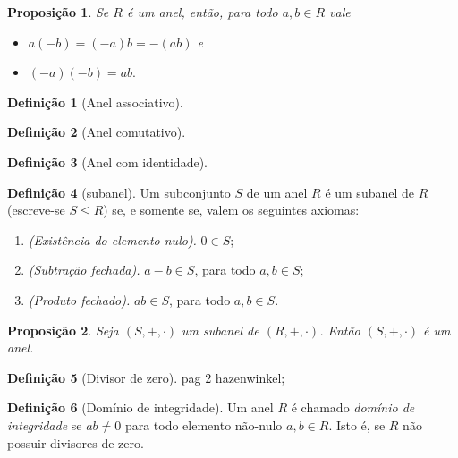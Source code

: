 \documentclass[a4paper,12pt]{report}
\theoremstyle{plain}
\newtheorem{proposicao}{Proposição}[section]
\theoremstyle{definition}
\newtheorem{definicao}{Definição}[section]
\begin{document}
	\begin{proposicao}
		Se $R$ é um anel, então, para todo $a,b\in R$ vale
		\begin{itemize}
			\item $a(-b) = (-a)b = -(ab)$ e
			\item $(-a)(-b) = ab.$
		\end{itemize}
	\end{proposicao}
	
	\begin{definicao}[Anel associativo]
		
	\end{definicao}
	
	\begin{definicao}[Anel comutativo]
		
	\end{definicao}
	
	\begin{definicao}[Anel com identidade]
		
	\end{definicao}
	
	\begin{definicao}[subanel]
		Um subconjunto $S$ de um anel $R$ é um subanel de $R$ (escreve-se $S\leq R$) se, e somente se, valem os seguintes axiomas:
		\begin{enumerate}
			\item \emph{(Existência do elemento nulo).} $0 \in S$;
			\item \emph{(Subtração fechada).} $a-b \in S$, para todo $a,b\in S$;
			\item \emph{(Produto fechado).} $ab\in S$, para todo $a,b\in S$.
		\end{enumerate}
	\end{definicao}
	
	\begin{proposicao}
		Seja $(S,+, \cdot)$ um subanel de $(R,+, \cdot)$. Então $(S,+, \cdot)$ é um anel.	
	\end{proposicao}
	
	\begin{definicao}[Divisor de zero]
		pag 2 hazenwinkel;
	\end{definicao}
	
	\begin{definicao}[Domínio de integridade]
		Um anel $R$ é chamado \emph{domínio de integridade} se $ab \neq 0$ para todo elemento não-nulo $a,b \in R$. Isto é, se $R$ não possuir divisores de zero.
	\end{definicao}
	
\end{document}
